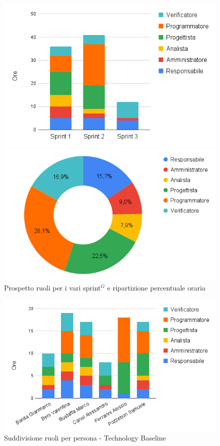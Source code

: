 \begin{figure}[h!]
	\centering
	\begin{minipage}[c]{0.3\textwidth}
    	\includegraphics[scale=0.46]{../../assets/Diagrammi_Excel/sprint_tec.png}
	\end{minipage}
\hfill
	\begin{minipage}[c]{0.46\textwidth}
		\includegraphics[scale=0.37]{../../assets/Diagrammi_Excel/torta_tec.png}
	\end{minipage}
	\caption{Prospetto ruoli per i vari sprint$^G$ e ripartizione percentuale oraria}
\end{figure}

\begin{figure}[h!]
	\centering
	\includegraphics[scale=0.47]{../../assets/Diagrammi_Excel/person_tec.png}
	\caption{Suddivisione ruoli per persona - Technology Baseline}
\end{figure}
\newpage

